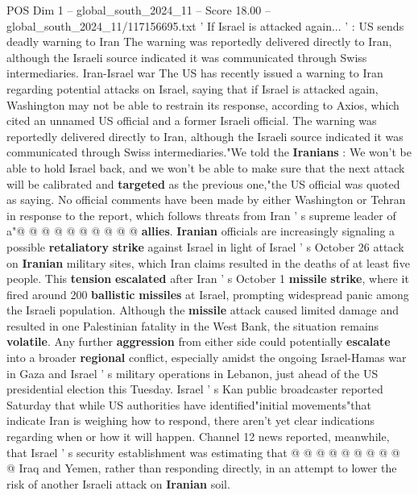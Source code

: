 \begin{textsample}{POS Dim 1 – global\_south\_2024\_11 – Score 18.00 – global\_south\_2024\_11/117156695.txt}  \label{ex:f1_pos_178}
' If Israel is attacked again... ' : US sends deadly warning to Iran The warning was reportedly delivered directly to Iran, although the Israeli source indicated it was communicated through Swiss intermediaries.
Iran-Israel war The US has recently issued a warning to Iran regarding potential attacks on Israel, saying that if Israel is attacked again, Washington may not be able to restrain its response, according to Axios, which cited an unnamed US official and a former Israeli official.
The warning was reportedly delivered directly to Iran, although the Israeli source indicated it was communicated through Swiss intermediaries."We told the \textbf{Iranians} : We won't be able to hold Israel back, and we won't be able to make sure that the next attack will be calibrated and \textbf{targeted} as the previous one,"the US official was quoted as saying.
No official comments have been made by either Washington or Tehran in response to the report, which follows threats from Iran ' s supreme leader of a"@ @ @ @ @ @ @ @ @ @ \textbf{allies}. \textbf{Iranian} officials are increasingly signaling a possible \textbf{retaliatory} \textbf{strike} against Israel in light of Israel ' s October 26 attack on \textbf{Iranian} military sites, which Iran claims resulted in the deaths of at least five people.
This \textbf{tension} \textbf{escalated} after Iran ' s October 1 \textbf{missile} \textbf{strike}, where it fired around 200 \textbf{ballistic} \textbf{missiles} at Israel, prompting widespread panic among the Israeli population.
Although the \textbf{missile} attack caused limited damage and resulted in one Palestinian fatality in the West Bank, the situation remains \textbf{volatile}.
Any further \textbf{aggression} from either side could potentially \textbf{escalate} into a broader \textbf{regional} conflict, especially amidst the ongoing Israel-Hamas war in Gaza and Israel ' s military operations in Lebanon, just ahead of the US presidential election this Tuesday.
Israel ' s Kan public broadcaster reported Saturday that while US authorities have identified"initial movements"that indicate Iran is weighing how to respond, there aren't yet clear indications regarding when or how it will happen.
Channel 12 news reported, meanwhile, that Israel ' s security establishment was estimating that @ @ @ @ @ @ @ @ @ @ Iraq and Yemen, rather than responding directly, in an attempt to lower the risk of another Israeli attack on \textbf{Iranian} soil.

\end{textsample}
